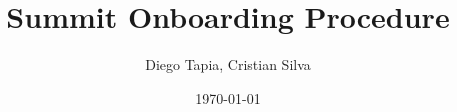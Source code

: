 \documentclass[PMO,authoryear,toc]{lsstdoc}
\title{Summit Onboarding Procedure}
\author{%
Diego Tapia, Cristian Silva
}
\date {\today}
\begin{document}
\maketitle



\appendix
\renewcommand{\refname}{} %


%
\end{document}
